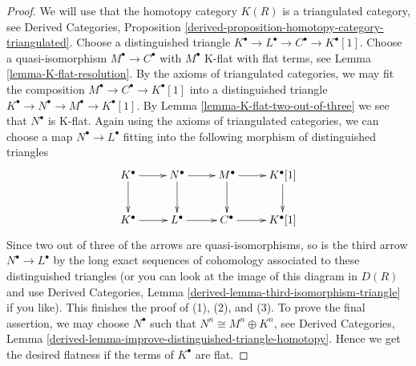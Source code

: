 \documentclass[10pt,a4paper]{amsart}
\theoremstyle{plain}
\theoremstyle{definition}
\theoremstyle{remark}
\numberwithin{equation}{subsection}
\begin{document}
\begin{proof}
We will use that the homotopy category $K(R)$
is a triangulated category, see Derived Categories, Proposition
\ref{derived-proposition-homotopy-category-triangulated}.
Choose a distinguished triangle
$K^\bullet \to L^\bullet \to C^\bullet \to K^\bullet[1]$.
Choose a quasi-isomorphism $M^\bullet \to C^\bullet$ with
$M^\bullet$ K-flat with flat terms, see Lemma \ref{lemma-K-flat-resolution}.
By the axioms of triangulated categories,
we may fit the composition $M^\bullet \to C^\bullet \to K^\bullet[1]$
into a distinguished triangle
$K^\bullet \to N^\bullet \to M^\bullet \to K^\bullet[1]$.
By Lemma \ref{lemma-K-flat-two-out-of-three} we see that $N^\bullet$ is K-flat.
Again using the axioms of triangulated categories,
we can choose a map $N^\bullet \to L^\bullet$ fitting into
the following morphism of distinguished triangles
$$
\xymatrix{
K^\bullet \ar[r] \ar[d] &
N^\bullet \ar[r] \ar[d] &
M^\bullet \ar[r] \ar[d] &
K^\bullet[1] \ar[d] \\
K^\bullet \ar[r] &
L^\bullet \ar[r] &
C^\bullet \ar[r] &
K^\bullet[1]
}
$$
Since two out of three of the arrows are quasi-isomorphisms, so is
the third arrow $N^\bullet \to L^\bullet$ by the long exact sequences
of cohomology associated to these distinguished triangles
(or you can look at the image of this diagram in $D(R)$ and use
Derived Categories, Lemma \ref{derived-lemma-third-isomorphism-triangle}
if you like). This finishes the proof of (1), (2), and (3).
To prove the final assertion, we may choose $N^\bullet$
such that $N^n \cong M^n \oplus K^n$, see
Derived Categories, Lemma
\ref{derived-lemma-improve-distinguished-triangle-homotopy}.
Hence we get the desired flatness
if the terms of $K^\bullet$ are flat.
\end{proof}
\end{document}
